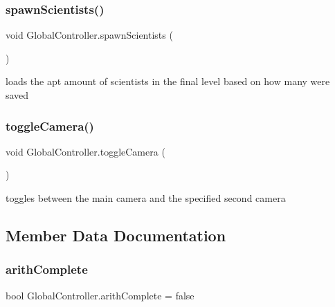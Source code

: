 \mbox{\label{class_global_controller_a557ce172d6b9580858646f53c354cfcb}} 
\subsubsection{\texorpdfstring{spawn\+Scientists()}{spawnScientists()}}
{\footnotesize\ttfamily void Global\+Controller.\+spawn\+Scientists (\begin{DoxyParamCaption}{ }\end{DoxyParamCaption})}



loads the apt amount of scientists in the final level based on how many were saved 

\mbox{\label{class_global_controller_af4ff92ac33a69fb09fd302cd775b9e96}} 
\subsubsection{\texorpdfstring{toggle\+Camera()}{toggleCamera()}}
{\footnotesize\ttfamily void Global\+Controller.\+toggle\+Camera (\begin{DoxyParamCaption}{ }\end{DoxyParamCaption})}



toggles between the main camera and the specified second camera 



\subsection{Member Data Documentation}
\mbox{\label{class_global_controller_adb1a210e3781f70338fb7e41bbf27bf5}} 
\subsubsection{\texorpdfstring{arith\+Complete}{arithComplete}}
{\footnotesize\ttfamily bool Global\+Controller.\+arith\+Complete = false}



